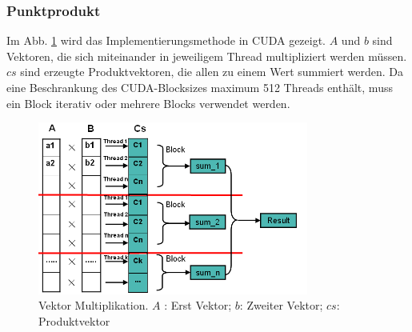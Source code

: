 
\subsubsection{Punktprodukt}

Im Abb. \ref{Vektor} wird das Implementierungsmethode in CUDA gezeigt. $A$ und $b$ sind Vektoren, die sich miteinander in jeweiligem Thread multipliziert werden müssen. $cs$ sind erzeugte Produktvektoren, die allen zu einem Wert summiert werden. Da eine Beschrankung des CUDA-Blocksizes maximum 512 Threads enthält, muss ein Block iterativ oder mehrere Blocks verwendet werden.

\begin{figure}[htbp]
\includegraphics[width=3.5in]{../xby/pic/Vektor}
\caption{Vektor Multiplikation. $A$ : Erst Vektor; $b$: Zweiter Vektor; $cs$: Produktvektor}
\label{Vektor}
\end{figure}